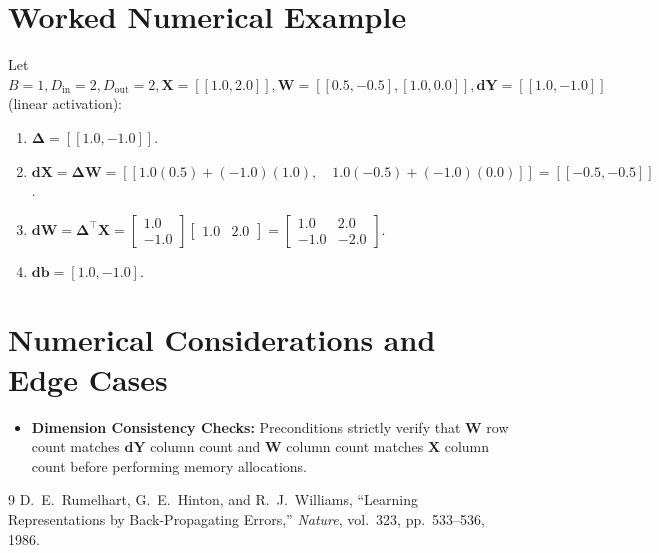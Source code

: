 \documentclass[11pt]{article}
\begin{document}
\section{Worked Numerical Example}
\label{sec:worked_example}

Let $B = 1, D_{\mathrm{in}} = 2, D_{\mathrm{out}} = 2, \mathbf{X} = [[1.0, 2.0]], \mathbf{W} = [[0.5, -0.5], [1.0, 0.0]], \mathbf{dY} = [[1.0, -1.0]]$ (linear activation):
\begin{enumerate}
    \item $\mathbf{\Delta} = [[1.0, -1.0]]$.
    \item $\mathbf{dX} = \mathbf{\Delta} \mathbf{W} = [[1.0(0.5) + (-1.0)(1.0), \quad 1.0(-0.5) + (-1.0)(0.0)]] = [[-0.5, -0.5]]$.
    \item $\mathbf{dW} = \mathbf{\Delta}^\top \mathbf{X} = \begin{bmatrix} 1.0 \\ -1.0 \end{bmatrix} \begin{bmatrix} 1.0 & 2.0 \end{bmatrix} = \begin{bmatrix} 1.0 & 2.0 \\ -1.0 & -2.0 \end{bmatrix}$.
    \item $\mathbf{db} = [1.0, -1.0]$.
\end{enumerate}

\section{Numerical Considerations and Edge Cases}
\label{sec:numerical}

\begin{itemize}
    \item \textbf{Dimension Consistency Checks:} Preconditions strictly verify that $\mathbf{W}$ row count matches $\mathbf{dY}$ column count and $\mathbf{W}$ column count matches $\mathbf{X}$ column count before performing memory allocations.
\end{itemize}

\begin{thebibliography}{9}
 D.~E.~Rumelhart, G.~E.~Hinton, and R.~J.~Williams, ``Learning Representations by Back-Propagating Errors,'' \emph{Nature}, vol.~323, pp.~533--536, 1986.
\end{thebibliography}
\end{document}
